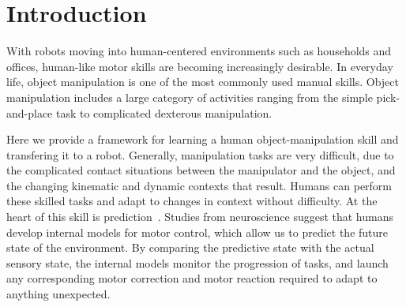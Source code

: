 \section{Introduction}
\label{intro}

With robots moving into human-centered environments such as households
and offices, human-like motor skills are becoming increasingly
desirable. In everyday life, object manipulation is one of the most
commonly used manual skills. Object manipulation includes a large
category of activities ranging from the simple pick-and-place task to
complicated dexterous manipulation.  

Here we provide a framework for learning a human object-manipulation skill
and transfering it to a robot.
Generally, manipulation tasks are very difficult, due to the
complicated contact situations between the manipulator and the object,
and the changing kinematic and dynamic contexts that result. Humans
can perform these skilled tasks and adapt to changes in context
without difficulty. At the heart of this skill is
prediction~\citep{flanagan2006control}. Studies from neuroscience
suggest that humans develop internal models for motor control, which
allow us to predict the future state of the environment. By comparing
the predictive state with the actual sensory state, the internal
models monitor the progression of  tasks, and launch any
corresponding motor correction and motor reaction required to
adapt to anything unexpected. %

